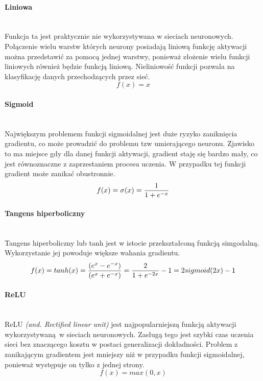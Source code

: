 \paragraph{Liniowa} \mbox{}\\
Funkcja ta jest praktycznie nie wykorzystywana w sieciach neuronowych. Połączenie
wielu warstw których neurony posiadają liniową funkcję aktywacji można przedstawić
za pomocą jednej warstwy,  ponieważ złożenie wielu funkcji liniowych również będzie
funkcją liniową. Nieliniowość funkcji pozwala na klasyfikację danych przechodzących
przez sieć.
\begin{equation}
f(x) = x
\end{equation}


\paragraph{Sigmoid} \mbox{}\\
Największym problemem funkcji sigmoidalnej jest duże ryzyko zaniknięcia gradientu,
co może prowadzić do problemu tzw umierającego neuronu. Zjawisko to ma miejsce
gdy dla danej funkcji aktywacji, gradient staję się bardzo mały, co jest równoznaczne
z zaprzestaniem procesu uczenia. W przypadku tej funkcji gradient może zanikać obustronnie.
\begin{equation}
f(x) = \sigma(x) = \frac{1}{1 + e^{-x}} \\
\end{equation}

\paragraph{Tangens hiperboliczny} \mbox{}\\
Tangens hiperboliczny lub tanh jest w istocie przekształconą funkcją simgodalną. Wykorzystanie
jej powoduje większe wahania gradientu.
\begin{equation}
f(x) = tanh(x) = \frac{(e^x - e^{-x})}{(e^x + e^{-x})} = \frac{2}{1+e^{-2x}} - 1 = 2 sigmoid(2x) - 1\\
\end{equation}

\paragraph{ReLU} \mbox{}\\
ReLU \textit{(and. Rectified linear unit)} jest najpopularniejszą funkcją aktywacji
wykorzystywaną w sieciach neuronowych. Zasługą tego jest szybki czas uczenia sieci
bez znaczącego kosztu w postaci generalizacji dokładności. Problem z zanikającym
gradientem jest mniejszy niż w przypadku funkcji sigmoidalnej, ponieważ występuje
on tylko z jednej strony.
\begin{equation}
f(x) = max(0, x)
\end{equation}

